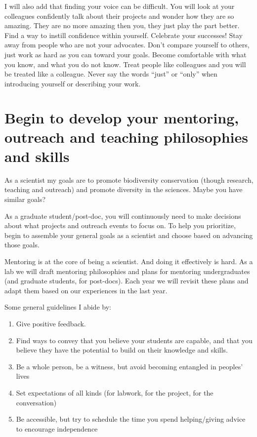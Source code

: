 \documentclass[12pt]{article}
\begin{document}
I will also add that finding your voice can be difficult. You will
look at your colleagues confidently talk about their projects and wonder
how they are so amazing. They are no more amazing then you, they just
play the part better. Find a way to instill confidence within
yourself. Celebrate your successes! Stay away from people who are not
your advocates. Don't compare yourself to others, just work as hard as
you can toward your goals. Become comfortable with what you know, and
what you do not know. Treat people like colleagues and you will be
treated like a colleague. Never say the words ``just'' or ``only'' when
introducing yourself or describing your work.

\section{Begin to develop your mentoring, outreach and teaching
  philosophies and skills}
\label{sec:skills}

As a scientist my goals are to promote biodiversity conservation
(though research, teaching and outreach) and promote diversity in the
sciences. Maybe you have similar goals?

As a graduate student/post-doc, you will continuously need to make
decisions about what projects and outreach events to focus on. To help
you prioritize, begin to assemble your general goals as a scientist
and choose based on advancing those goals.

Mentoring is at the core of being a scientist. And doing it
effectively is hard. As a lab we will draft mentoring philosophies and
plans for mentoring undergraduates (and graduate students, for
post-docs). Each year we will revisit these plans and adapt them based
on our experiences in the last year.

Some general guidelines I abide by:
\begin{enumerate}
\item Give positive feedback.
\item Find ways to convey that you believe your students are capable,
  and that you believe they have the potential to build on their
  knowledge and skills.
\item Be a whole person, be a witness, but avoid becoming entangled in
  peoples' lives
\item Set expectations of all kinds (for labwork, for the project, for
  the conversation)
\item Be accessible, but try to schedule the time you spend
  helping/giving advice to encourage independence
\end{enumerate}
\end{document}
